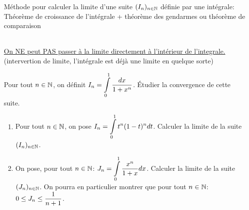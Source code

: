 \documentclass[a4paper, 11pt]{article}
\begin{document}
{{{%
%

\vsec




\begin{dboxminipage}{13cm}
	M\'ethode pour calculer la limite d'une suite $(I_n)_{n\in\mathbb{N}}$ d\'efinie par une int\'egrale:\\
	Th\'eor\`eme de croissance de l'int\'egrale + th\'eor\`eme des gendarmes ou th\'eor\`eme de comparaison
\end{dboxminipage}
\vsec \\
\underline{On NE peut PAS passer à la limite directement à l'intérieur de l'integrale. } (intervertion de limite, l'intégrale est déjà une limite en quelque sorte)

\vsec

{\footnotesize \begin{exo}
		Pour tout $n\in\mathbb{N}$, on d\'efinit $I_n=\displaystyle \int\limits_0^1 \displaystyle\frac{dx}{1+x^n}$. \'Etudier la convergence de cette suite.
	\end{exo}}



{\footnotesize \begin{exo}
		\begin{enumerate}
			\item Pour tout $n\in\mathbb{N}$, on pose $I_n=\displaystyle \int\limits_0^1 t^n(1-t)^n dt$. Calculer la limite de la suite $(I_n)_{n\in\mathbb{N}}$.
			\item On pose, pour tout $n\in\mathbb{N}$: $J_n=\displaystyle \int\limits_0^1 \displaystyle\frac{x^n}{1+x} dx$. Calculer la limite de la suite $(J_n)_{n\in\mathbb{N}}$. On pourra en particulier montrer que pour tout $n\in\mathbb{N}$: $0\leq J_n \leq \displaystyle\frac{1}{n+1}$.
		\end{enumerate}
	\end{exo}}
\vsec\vsec


}}}
\end{document}
